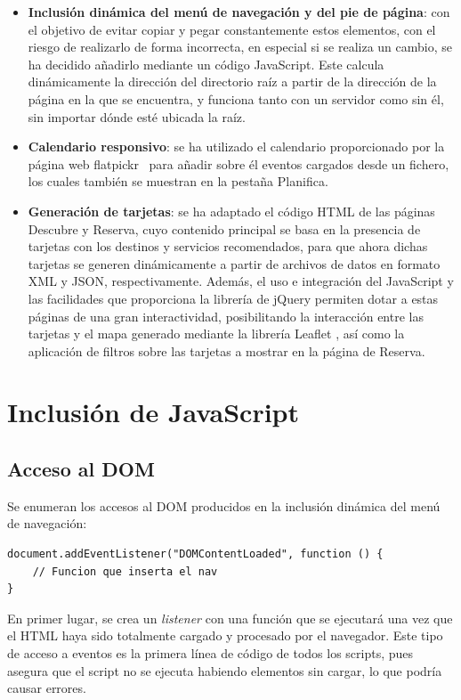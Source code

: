 \documentclass[11pt, a4paper]{book}
\begin{document}
	\begin{itemize}
		\item \textbf{Inclusión dinámica del menú de navegación y del pie de página}: con el objetivo de evitar copiar y pegar constantemente estos elementos, con el riesgo de realizarlo de forma incorrecta, en especial si se realiza un cambio, se ha decidido añadirlo mediante un código JavaScript. Este calcula dinámicamente la dirección del directorio raíz a partir de la dirección de la página en la que se encuentra, y funciona tanto con un servidor como sin él, sin importar dónde esté ubicada la raíz.
		\item \textbf{Calendario responsivo}: se ha utilizado el calendario proporcionado por la página web flatpickr~\cite{flatpickr} para añadir sobre él eventos cargados desde un fichero, los cuales también se muestran en la pestaña Planifica.
        \item \textbf{Generación de tarjetas}: se ha adaptado el código HTML de las páginas Descubre y Reserva, cuyo contenido principal se basa en la presencia de tarjetas con los destinos y servicios recomendados, para que ahora dichas tarjetas se generen dinámicamente a partir de archivos de datos en formato XML y JSON, respectivamente. Además, el uso e integración del JavaScript y las facilidades que proporciona la librería de jQuery permiten dotar a estas páginas de una gran interactividad, posibilitando la interacción entre las tarjetas y el mapa generado mediante la librería Leaflet \cite{leaflet}, así como la aplicación de filtros sobre las tarjetas a mostrar en la página de Reserva.
	\end{itemize}
	
	\section{Inclusión de JavaScript}
    \subsection{Acceso al DOM}
	
	Se enumeran los accesos al DOM producidos en la inclusión dinámica del menú de navegación:
	
	\begin{lstlisting}
document.addEventListener("DOMContentLoaded", function () {
	// Funcion que inserta el nav
}
	\end{lstlisting}

	En primer lugar, se crea un \textit{listener} con una función que se ejecutará una vez que el HTML haya sido totalmente cargado y procesado por el navegador. Este tipo de acceso a eventos es la primera línea de código de todos los scripts, pues asegura que el script no se ejecuta habiendo elementos sin cargar, lo que podría causar errores.
	
\end{document}
